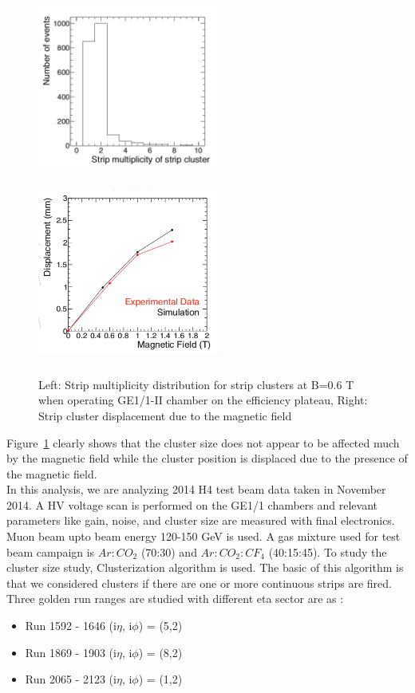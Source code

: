   \begin{figure}[!htbp]
    \begin{center}
      
      \includegraphics[width=6cm,height=6cm]{figures/GEM/GEMStrip.png}
      \includegraphics[width=6cm,height=6cm]{figures/GEM/GEMStrip1.png}
      
      
      \caption{Left: Strip multiplicity distribution for strip clusters at B=0.6 T when operating GE1/1-II chamber on the efficiency plateau, Right: Strip cluster displacement due to the magnetic field}
      \label{fig:StripM}
    \end{center}
  \end{figure}

Figure~\ref{fig:StripM} clearly shows that the cluster size does not appear to be affected much by the magnetic field while the cluster position is displaced due to the presence of the magnetic field.\\
In this analysis, we are analyzing 2014 H4 test beam data taken in November 2014. A HV voltage scan is performed on the GE1/1 chambers and relevant parameters like gain, noise, and cluster size are measured with final electronics. Muon beam upto beam energy 120-150 GeV is used. A gas mixture used for test beam campaign is $Ar:CO_{2}$ (70:30) and $Ar:CO_{2}:CF_{4}$ (40:15:45).
To study the cluster size study, Clusterization algorithm is used. The basic of this algorithm is that we considered clusters if there are one or more continuous strips are fired. Three golden run ranges are studied with different eta sector are as :\\
\begin{itemize}
\item{Run 1592 - 1646 (i$\eta$, i$\phi$) = (5,2)}
\item{Run 1869 - 1903 (i$\eta$, i$\phi$) = (8,2)}
\item{Run 2065 - 2123 (i$\eta$, i$\phi$) = (1,2)}
\end{itemize}

